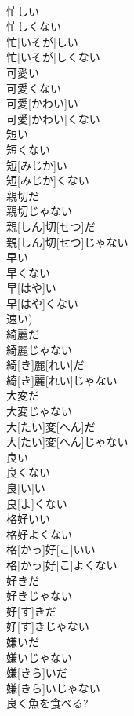 \documentclass[8pt]{extreport}
\begin{document}
\begin{CJK}{UTF8}{min}
\\	忙しい 
\\	忙しくない	
\\	忙[いそが]しい 
\\	忙[いそが]しくない
\\	可愛い 
\\	可愛くない	
\\	可愛[かわい]い 
\\	可愛[かわい]くない
\\	短い 
\\	短くない	
\\	短[みじか]い 
\\	短[みじか]くない
\\	親切だ 
\\	親切じゃない	
\\	親[しん]切[せつ]だ 
\\	親[しん]切[せつ]じゃない
\\	早い 
\\	早くない	
\\	早[はや]い 
\\	早[はや]くない 
\\	速い)
\\	綺麗だ 
\\	綺麗じゃない	
\\	綺[き]麗[れい]だ 
\\	綺[き]麗[れい]じゃない
\\	大変だ 
\\	大変じゃない	
\\	大[たい]変[へん]だ 
\\	大[たい]変[へん]じゃない
\\	良い 
\\	良くない	
\\	良[い]い 
\\	良[よ]くない
\\	格好いい 
\\	格好よくない	
\\	格[かっ]好[こ]いい 
\\	格[かっ]好[こ]よくない
\\	好きだ 
\\	好きじゃない	
\\	好[す]きだ 
\\	好[す]きじゃない
\\	嫌いだ 
\\	嫌いじゃない	
\\	嫌[きら]いだ 
\\	嫌[きら]いじゃない
\\	良く魚を食べる? 

\end{CJK}
\end{document}
